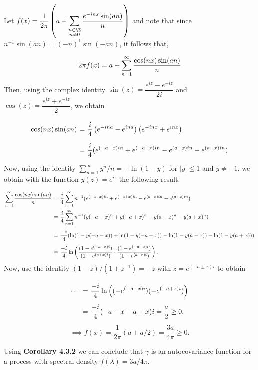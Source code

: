 Let $\displaystyle f(x) = \frac{1}{2\pi} \left( a + \sum_{\substack{n \in \Z\\ n \neq 0}}\frac{ e^{-inx} \sin(an)}{n} \right)$ and note that since $n^{-1} \sin(an) = (-n)^1 \sin(-an) $, it follows that,
\[ \everymath{\displaystyle}
\arraycolsep=1.8pt\def\arraystretch{2.5}
\begin{array}{rcl}
    2\pi f(x) =  a + \sum_{n = 1}^{\infty} \frac{\cos(nx)\sin(an)}{n} 
\end{array}\]
Then, using the complex identity $\sin(z) = \dfrac{e^{iz}-e^{-iz}}{2i}$ and $\cos(z) = \dfrac{e^{iz}+e^{-iz}}{2}$, we obtain
\[ \everymath{\displaystyle}
\arraycolsep=1.8pt\def\arraystretch{2.5}
\begin{array}{rcl}
    \cos(nx)\sin(an) & = & \frac{i}{4}\left( e^{-ina} - e^{ina} \right)\left( e^{-inx} + e^{inx} \right)\\
    & = & \frac{i}{4} (e^{(-a-x)in}+e^{(-a+x)in}-e^{(a-x)in}-e^{(a+x)in})
\end{array} \]
Now, using the identity $\sum_{n = 1}^{\infty} y^n/n = -\ln(1-y)$ for $|y| \leq 1$ and $y \neq -1$, we obtain with the function $y(z) = e^{iz}$ the following result:
\[ \everymath{\displaystyle}
\arraycolsep=1.8pt\def\arraystretch{2.5}
\begin{array}{rcl}
    \sum_{n = 1}^{\infty} \frac{\cos(nx)\sin(an)}{n}
    & = & \frac{i}{4} \sum_{n = 1}^{\infty} n^{-1}
     (e^{(-a-x)in}+e^{(-a+x)in}-e^{(a-x)in}-e^{(a+x)in})\\
    & = & \frac{i}{4} \sum_{n = 1}^{\infty} n^{-1} (y(-a-x)^n+y(-a+x)^n-y(a-x)^n-y(a+x)^n)\\
    & = & \frac{-i}{4} (\ln(1-y(-a-x)) + \ln(1-y(-a+x)) - \ln(1-y(a-x)) - \ln(1-y(a+x)))\\
    & = & \frac{-i}{4} \ln\left( \frac{(1-e^{(-a-x)i})}{(1-e^{(a+x)i})} \cdot \frac{(1-e^{(-a+x)i})}{(1-e^{(a-x)i})} \right).
\end{array}\]
Now, use the identity $(1-z)/(1+z^{-1}) = -z$ with $z = e^{(-a\pm x)i}$ to obtain
\[ \everymath{\displaystyle}
\arraycolsep=1.8pt\def\arraystretch{2.5}
\begin{array}{rcl}
    \cdots & = & \frac{-i}{4} \ln\left( (-e^{(-a-x)i})(-e^{(-a+x)i}) \right)\\
    & = & \frac{-i}{4} (-a-x-a+x)i = \frac{a}{2} \geq 0.
\end{array}\]
\[ \implies f(x) = \frac{1}{2\pi}(a+a/2) = \frac{3a}{4\pi} \geq 0. \]

Using \textbf{Corollary 4.3.2} we can conclude that $\gamma$ is an autocovariance function for a process with spectral density $f(\lambda) = 3a/4\pi$.

